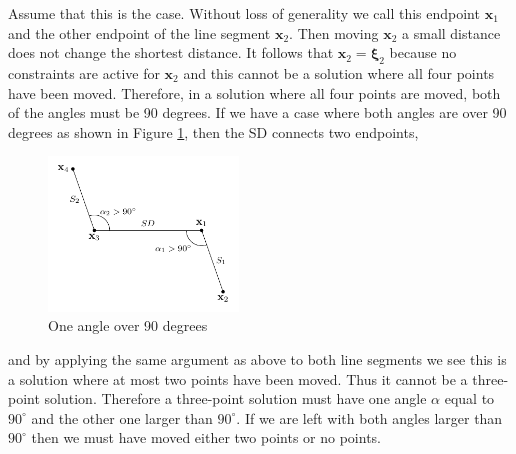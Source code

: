 %
Assume that this is the case.
Without loss of generality we call this endpoint $\textbf{x}_1$ and the other endpoint of
the line segment $\textbf{x}_2$. Then moving $\textbf{x}_2$ a small distance does not
change the shortest distance. It follows that $\textbf{x}_2 = \boldsymbol{\xi}_2$ because
no constraints are active for $\textbf{x}_2$ and this cannot be a solution where all four
points have been moved. Therefore, in a solution where all four points are moved,
both of the angles must be 90 degrees.
%
If we have a case where both angles are over 90 degrees as shown in
Figure \ref{fig:four_point_angles_3p}, then the SD connects two
endpoints,
%
\begin{figure}[H]
	\centering
	\includegraphics[width=0.45\textwidth]{figures/constraint_handling/interwell_angles_3p.pdf}
	\caption{One angle over 90 degrees}
	\label{fig:four_point_angles_3p}
\end{figure}
%
\noindent and by applying the same argument as above to 
both line segments we see this is a solution where at most
two points have been moved. Thus it cannot be a three-point solution.
Therefore a three-point solution must have one angle $\alpha$
equal to $90^{\circ}$ and the other one larger than $90^{\circ}$.
%
If we are left with both angles larger than $90^{\circ}$ then we must have moved either
two points or no points.
%
